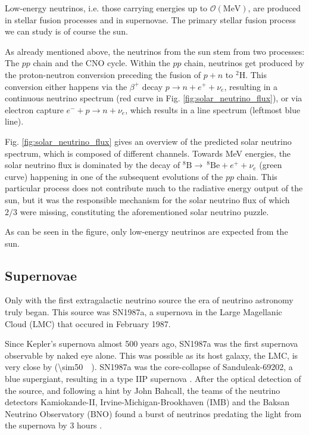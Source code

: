 \documentclass[
    a4paper, %
    fontsize=10pt, %
    twoside=false, %
    numbers=noenddot, %
    fontmethod=tex,
]{kaobook}
\begin{document}
Low-energy neutrinos, i.e. those carrying energies up to $\mathcal{O}(\unit{\mega\eV})$, are produced in stellar fusion processes and in supernovae. The primary stellar fusion process we can study is of course the sun.

As already mentioned above, the neutrinos from the sun stem from two processes: The $pp$ chain and the CNO cycle. Within the $pp$ chain, neutrinos get produced by the proton-neutron conversion preceding the fusion of $p+n$ to $^2 \text{H}$. This conversion either happens via the $\beta^+$ decay $p \rightarrow n + e^+ + \nu_e$, resulting in a continuous neutrino spectrum (red curve in Fig. \ref{fig:solar_neutrino_flux}), or via electron capture $e^- + p \rightarrow n + \nu_e$, which results in a line spectrum (leftmost blue line).

Fig. \ref{fig:solar_neutrino_flux} gives an overview of the predicted solar neutrino spectrum, which is composed of different channels. Towards \unit{\mega\eV} energies, the solar neutrino flux is dominated by the decay of $^8\text{B}\rightarrow ~^8\text{Be} + e^+ + \nu_e$ (green curve) happening in one of the subsequent evolutions of the $pp$ chain. This particular process does not contribute much to the radiative energy output of the sun, but it was the responsible mechanism for the solar neutrino flux of which $2/3$ were missing, constituting the aforementioned solar neutrino puzzle.

As can be seen in the figure, only low-energy neutrinos are expected from the sun.

\subsection{Supernovae} \label{sne}
Only with the first extragalactic neutrino source the era of neutrino astronomy truly began. This source was SN1987a, a supernova in the Large Magellanic Cloud (LMC) that occured in February 1987.

Since Kepler's supernova almost 500 years ago, SN1987a was the first supernova observable by naked eye alone. This was possible as its host galaxy, the LMC, is very close by (\SI{\sim50}{\kilo\parsec}). SN1987a was the core-collapse of Sanduleak-69202, a blue supergiant, resulting in a type IIP supernova . After the optical detection of the source, and following a hint by John Bahcall, the teams of the neutrino detectors Kamiokande-II, Irvine-Michigan-Brookhaven (IMB) and the Baksan Neutrino Observatory (BNO) found a burst of neutrinos predating the light from the supernova by 3 hours .
\end{document}
